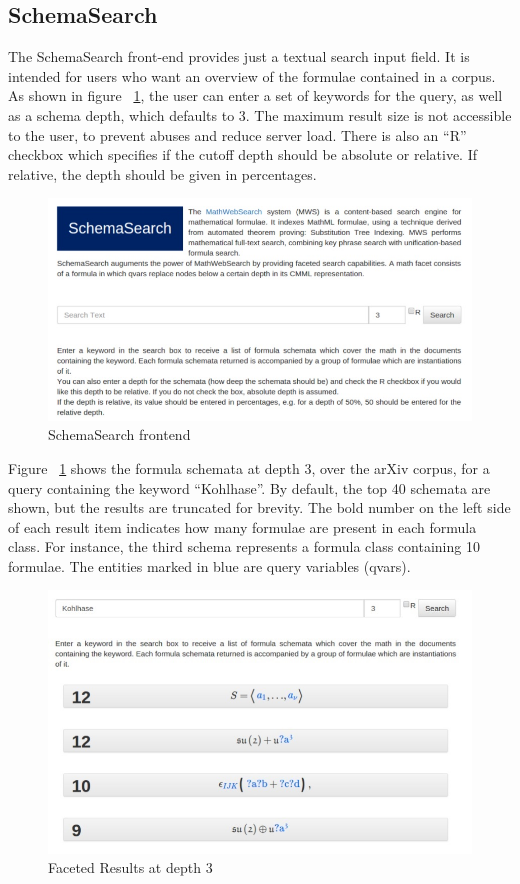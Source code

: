 \documentclass{deliverablereport}
\begin{document}
\subsection{SchemaSearch}\label{shcemasearch}
The SchemaSearch front-end provides just a textual search input field. It is intended for users who want an overview of the formulae contained in a corpus. As shown in figure ~\ref{fig:schema_search}, the user can enter a set of keywords for the query, as well as a schema depth, which defaults to 3. The maximum result size is not accessible to the user, to prevent abuses and reduce server load. There is also an “R” checkbox which specifies if the cutoff depth should be absolute or relative. If relative, the depth should be given in percentages. ~\cite{Ham:bcs15}

\begin{figure}[h]
\centering
 \includegraphics[scale=0.9]{figure5.jpg}
 \caption{SchemaSearch frontend}
 \label{fig:schema_search}
\end{figure}

Figure ~\ref{fig:schema_search} shows the formula schemata at depth 3, over the arXiv corpus, for a query containing the keyword “Kohlhase”. By default, the top 40 schemata are shown, but the results are truncated for brevity. The bold number on the left side of each result item indicates how many formulae are present in each formula class. For instance, the third schema represents a formula class containing 10 formulae. The entities marked in blue are query variables (qvars). 

\begin{figure}[H]
\centering
 \includegraphics[scale=0.8]{figure6.jpg}
 \caption{Faceted Results at depth 3}
 \label{fig:depth3}
\end{figure}
\end{document}
